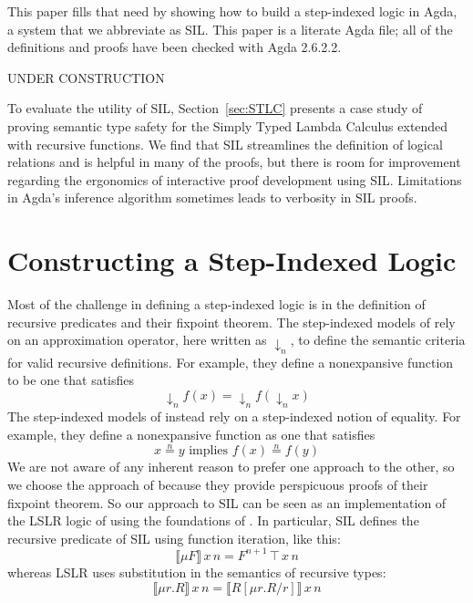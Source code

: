 \documentclass[acmsmall]{acmart}
\newcommand{\app}{\,}
\begin{document}
This paper fills that need by showing how to build a step-indexed
logic in Agda, a system that we abbreviate as SIL.  This paper is a
literate Agda file; all of the definitions and proofs have been
checked with Agda 2.6.2.2. 



UNDER CONSTRUCTION

To evaluate the utility of SIL, Section~\ref{sec:STLC} presents a case
study of proving semantic type safety for the Simply Typed Lambda
Calculus extended with recursive functions. We find that SIL
streamlines the definition of logical relations and is helpful in many
of the proofs, but there is room for improvement regarding the
ergonomics of interactive proof development using SIL.  Limitations in
Agda's inference algorithm sometimes leads to verbosity in SIL proofs.


% 








\section{Constructing a Step-Indexed Logic}

Most of the challenge in defining a step-indexed logic is in the
definition of recursive predicates and their fixpoint theorem. The
step-indexed models of \citet{Appel:2001aa} rely on an approximation
operator, here written as $↓_n$, to define the semantic criteria for
valid recursive definitions.  For example, they define a nonexpansive
function to be one that satisfies
\[
  ↓_n f(x) = ↓_n f(↓_n x)
\]
The step-indexed models of \citet{JUNG:2018aa} instead rely on
a step-indexed notion of equality. For example, they define a
nonexpansive function as one that satisfies
\[
  x \stackrel{n}{=} y \text{ implies } f(x) \stackrel{n}{=} f(y)
\]
We are not aware of any inherent reason to prefer one approach to the
other, so we choose the approach of \citet{Appel:2001aa} because they
provide perspicuous proofs of their fixpoint theorem.  So our approach
to SIL can be seen as an implementation of the LSLR logic of
\citet{Dreyer:2011wl} using the foundations of
\citet{Appel:2001aa}. In particular, SIL defines the recursive
predicate of SIL using function iteration, like this:
\[
  ⟦ μ F ⟧ \, x \, n = F^{n\plus 1}\, \top \, x \, n
\]
whereas LSLR uses substitution in the semantics of recursive types:
\[
   ⟦ μ r. R ⟧ \, x \, n = ⟦ R[μr.R/r] ⟧\,x\,n
\]
\end{document}
